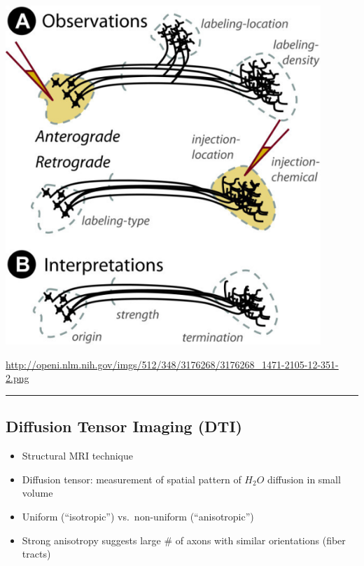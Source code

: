 \documentclass[]{article}
\providecommand{\tightlist}{%
  \setlength{\itemsep}{0pt}\setlength{\parskip}{0pt}}
\begin{document}
\begin{center}\includegraphics[width=450px]{img/retrograde-anterograde-tracers} \end{center}

\url{http://openi.nlm.nih.gov/imgs/512/348/3176268/3176268_1471-2105-12-351-2.png}

\begin{center}\rule{0.5\linewidth}{\linethickness}\end{center}

\hypertarget{diffusion-tensor-imaging-dti}{%
\subsection{\texorpdfstring{\textbf{Diffusion Tensor Imaging
(DTI)}}{Diffusion Tensor Imaging (DTI)}}\label{diffusion-tensor-imaging-dti}}

\begin{itemize}
\tightlist
\item
  Structural MRI technique
\item
  Diffusion tensor: measurement of spatial pattern of \(H_2O\) diffusion
  in small volume
\item
  Uniform (``isotropic'') vs.~non-uniform (``anisotropic'')
\item
  Strong anisotropy suggests large \# of axons with similar orientations
  (fiber tracts)
\end{itemize}
\end{document}
